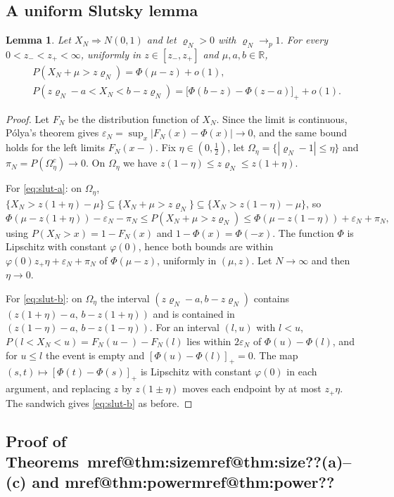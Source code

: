\documentclass[pdflatex,sn-mathphys-num,iicol]{sn-jnl}
\makeatletter
\theoremstyle{thmstyleone}
\newtheorem{lemma}[proposition]{Lemma}
\theoremstyle{thmstyletwo}
\theoremstyle{thmstylethree}
\newcommand{\Mref}[1]{\ifcsname mref@#1\endcsname\csname mref@#1\endcsname\else\textbf{??}\fi}
\makeatother
\begin{document}
\subsection{A uniform Slutsky lemma}\label{si:testing-slutsky}

\begin{lemma}\label{lem:slutsky}
Let $X_N\Rightarrow N(0,1)$ and let $\varrho_N>0$ with $\varrho_N\to_p1$. For every $0<z_-<z_+<\infty$, uniformly in $z\in[z_-,z_+]$ and $\mu,a,b\in\mathbb R$,
\begin{align}
&P(X_N+\mu>z\varrho_N)=\Phi(\mu-z)+o(1),\label{eq:slut-a}\\
&P(z\varrho_N-a<X_N<b-z\varrho_N)=\big[\Phi(b-z)-\Phi(z-a)\big]_++o(1).\label{eq:slut-b}
\end{align}
\end{lemma}
\begin{proof}
Let $F_N$ be the distribution function of $X_N$. Since the limit is continuous, P\'olya's theorem \citep[Lemma~2.11]{vandervaart1998} gives $\varepsilon_N=\sup_x|F_N(x)-\Phi(x)|\to0$, and the same bound holds for the left limits $F_N(x-)$. Fix $\eta\in(0,\tfrac12)$, let $\Omega_\eta=\{|\varrho_N-1|\le\eta\}$ and $\pi_N=P(\Omega_\eta^c)\to0$. On $\Omega_\eta$ we have $z(1-\eta)\le z\varrho_N\le z(1+\eta)$.

For \eqref{eq:slut-a}: on $\Omega_\eta$, $\{X_N>z(1+\eta)-\mu\}\subseteq\{X_N+\mu>z\varrho_N\}\subseteq\{X_N>z(1-\eta)-\mu\}$, so
\[
\Phi(\mu-z(1+\eta))-\varepsilon_N-\pi_N\le P(X_N+\mu>z\varrho_N)\le\Phi(\mu-z(1-\eta))+\varepsilon_N+\pi_N,
\]
using $P(X_N>x)=1-F_N(x)$ and $1-\Phi(x)=\Phi(-x)$. The function $\Phi$ is Lipschitz with constant $\varphi(0)$, hence both bounds are within $\varphi(0)z_+\eta+\varepsilon_N+\pi_N$ of $\Phi(\mu-z)$, uniformly in $(\mu,z)$. Let $N\to\infty$ and then $\eta\to0$.

For \eqref{eq:slut-b}: on $\Omega_\eta$ the interval $(z\varrho_N-a,b-z\varrho_N)$ contains $(z(1+\eta)-a,\,b-z(1+\eta))$ and is contained in $(z(1-\eta)-a,\,b-z(1-\eta))$. For an interval $(l,u)$ with $l<u$, $P(l<X_N<u)=F_N(u-)-F_N(l)$ lies within $2\varepsilon_N$ of $\Phi(u)-\Phi(l)$, and for $u\le l$ the event is empty and $[\Phi(u)-\Phi(l)]_+=0$. The map $(s,t)\mapsto[\Phi(t)-\Phi(s)]_+$ is Lipschitz with constant $\varphi(0)$ in each argument, and replacing $z$ by $z(1\pm\eta)$ moves each endpoint by at most $z_+\eta$. The sandwich gives \eqref{eq:slut-b} as before.
\end{proof}

\subsection{Proof of Theorems~\Mref{thm:size}(a)--(c) and \Mref{thm:power}}\label{si:testing-size}
\end{document}

